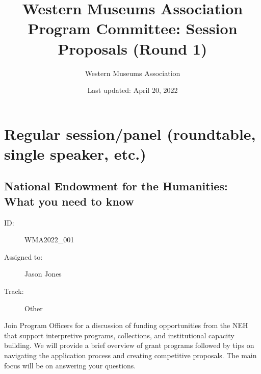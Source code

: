 \documentclass{report}
\title{ Western Museums Association Program Committee: Session Proposals (Round 1)}
\date{ Last updated: April 20, 2022}
\author{Western Museums Association}
\begin{document}
  \maketitle
  \newpage
  \tableofcontents
  \newpage
  
    \newpage
    \chapter*{ Regular session/panel (roundtable, single speaker, etc.) }

      
        
        
        
        
        
          \newpage
          \section{ National Endowment for the Humanities: What you need to know }
            \begin{description}
              \item [ID:]
              WMA2022\_001

              \item [Assigned to:]Jason Jones~
                \item [Track:]Other~
              \end{description}

              Join Program Officers for a discussion of funding opportunities from the NEH that support interpretive programs, collections, and institutional capacity building. We will provide a brief overview of grant programs followed by tips on navigating the application process and creating competitive proposals. The main focus will be on answering your questions.
\end{document}
